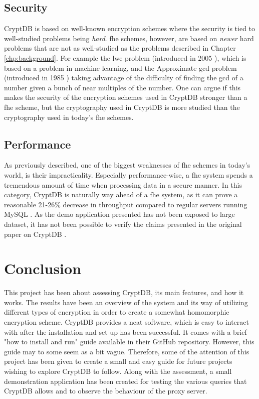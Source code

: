 \subsection{Security}

CryptDB is based on well-known encryption schemes where the security is tied to well-studied problems being \emph{hard}. \gls{fhe} schemes, however, are based on \emph{newer} hard problems that are not as well-studied as the problems described in Chapter \ref{chp:background}. For example the \gls{lwe} problem (introduced in 2005 \cite{lwe}), which is based on a problem in machine learning, and the Approximate \gls{gcd} problem (introduced in 1985 \cite{app_gcd}) taking advantage of the difficulty of finding the \gls{gcd} of a number given a bunch of near multiples of the number. One can argue if this makes the security of the encryption schemes used in CryptDB stronger than a \gls{fhe} scheme, but the cryptography used in CryptDB is more studied than the cryptography used in today's \gls{fhe} schemes.

\subsection{Performance}

As previously described, one of the biggest weaknesses of \gls{fhe} schemes in today's world, is their impracticality. Especially performance-wise, a \gls{fhe} system spends a tremendous amount of time when processing data in a secure manner. In this category, CryptDB is naturally way ahead of a \gls{fhe} system, as it can prove a reasonable 21-26\% decrease in throughput compared to regular servers running MySQL \cite{CryptDB_Main_Paper}. As the demo application presented has not been exposed to large dataset, it has not been possible to verify the claims presented in the original paper on CryptDB \citep{CryptDB_Main_Paper}.

\section{Conclusion}

This project has been about assessing CryptDB, its main features, and how it works. The results have been an overview of the system and its way of utilizing different types of encryption in order to create a somewhat homomorphic encryption scheme. CryptDB provides a neat software, which is easy to interact with after the installation and set-up has been successful. It comes with a brief "how to install and run" guide available in their GitHub repository. However, this guide may to some seem as a bit vague. Therefore, some of the attention of this project has been given to create a small and easy guide for future projects wishing to explore CryptDB to follow. Along with the assessment, a small demonstration application has been created for testing the various queries that CryptDB allows and to observe the behaviour of the proxy server.


